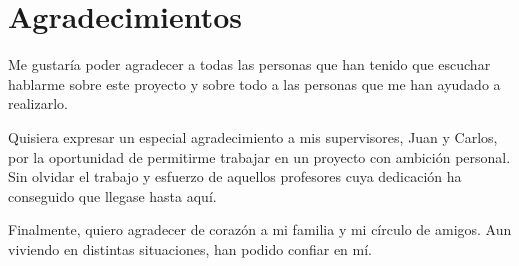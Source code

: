 
\begingroup
\chapter*{Agradecimientos}

Me gustaría poder agradecer a todas las personas que han tenido que escuchar hablarme sobre este proyecto y sobre todo a las personas que me han ayudado a realizarlo.

\vspace{0.3cm}

Quisiera expresar un especial agradecimiento a mis supervisores, Juan y Carlos, por la oportunidad de permitirme trabajar en un proyecto con ambición personal. Sin olvidar el trabajo y esfuerzo de aquellos profesores cuya dedicación ha conseguido que llegase hasta aquí.

\vspace{0.3cm}

Finalmente, quiero agradecer de corazón a mi familia y mi círculo de amigos. Aun viviendo en distintas situaciones, han podido confiar en mí.

\endgroup
